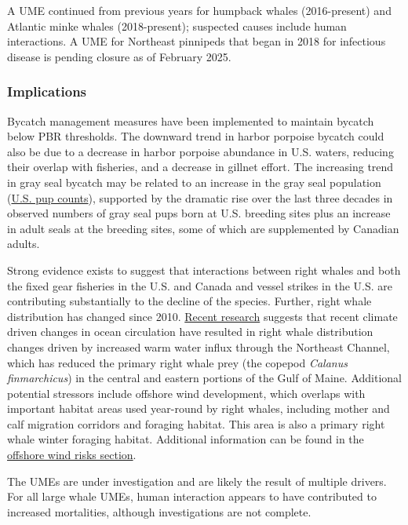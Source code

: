 \documentclass[
  10pt,
]{article}
\begin{document}
A UME continued from previous years for humpback whales (2016-present) and Atlantic minke whales (2018-present); suspected causes include human interactions. A UME for Northeast pinnipeds that began in 2018 for infectious disease is pending closure as of February 2025.

\subsubsection{Implications}\label{implications-5}

Bycatch management measures have been implemented to maintain bycatch below PBR thresholds. The downward trend in harbor porpoise bycatch could also be due to a decrease in harbor porpoise abundance in U.S. waters, reducing their overlap with fisheries, and a decrease in gillnet effort. The increasing trend in gray seal bycatch may be related to an increase in the gray seal population (\href{https://noaa-edab.github.io/catalog/seal_pups.html}{U.S. pup counts}), supported by the dramatic rise over the last three decades in observed numbers of gray seal pups born at U.S. breeding sites plus an increase in adult seals at the breeding sites, some of which are supplemented by Canadian adults.

Strong evidence exists to suggest that interactions between right whales and both the fixed gear fisheries in the U.S. and Canada and vessel strikes in the U.S. are contributing substantially to the decline of the species. Further, right whale distribution has changed since 2010. \href{https://noaa-edab.github.io/catalog/narw.html}{Recent research} suggests that recent climate driven changes in ocean circulation have resulted in right whale distribution changes driven by increased warm water influx through the Northeast Channel, which has reduced the primary right whale prey (the copepod \emph{Calanus finmarchicus}) in the central and eastern portions of the Gulf of Maine. Additional potential stressors include offshore wind development, which overlaps with important habitat areas used year-round by right whales, including mother and calf migration corridors and foraging habitat. This area is also a primary right whale winter foraging habitat. Additional information can be found in the \hyperref[other-ocean-uses-offshore-wind]{offshore wind risks section}.

The UMEs are under investigation and are likely the result of multiple drivers. For all large whale UMEs, human interaction appears to have contributed to increased mortalities, although investigations are not complete.
\end{document}
